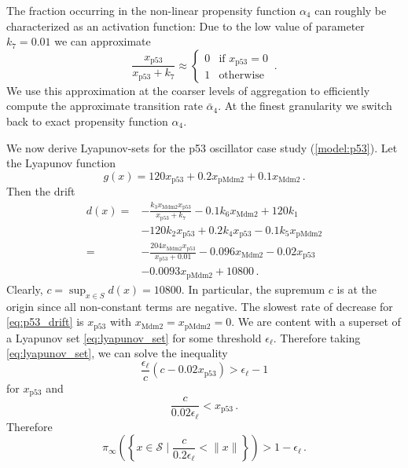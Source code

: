 The fraction occurring in the non-linear propensity function
$\alpha_4$ can roughly be characterized as an activation function:
Due to the low value of parameter $k_7=0.01$ we can
approximate
\[\frac{x_{\mathrm{p53}}}{x_{\mathrm{p53}} + k_7}
  \approx
  \begin{cases}
    0 & \text{if } x_{\mathrm{p53}} = 0\\
    1 & \text{otherwise}
  \end{cases}\,.
\]
We use this approximation at the coarser levels of aggregation to
efficiently compute the approximate transition rate $\bar{\alpha}_4$.
At the finest granularity we switch back to exact propensity function
$\alpha_4$.

We now derive Lyapunov-sets for the p53 oscillator case study
(\autoref{model:p53}). Let the Lyapunov function
\begin{equation}
  g(x) = 120 x_{\mathrm{p53}} + 0.2 x_{\mathrm{pMdm2}} + 0.1
  x_{\mathrm{Mdm2}}\,.
\end{equation}
Then the drift
\begin{equation}\label{eq:p53_drift}
  \begin{split}
    d(x) = & - \frac{k_3 x_{\mathrm{Mdm2}}
    x_{\mathrm{p53}}}{x_{\mathrm{p53}} + k_7}
    - 0.1 k_6 x_{\mathrm{Mdm2}}
    + 120 k_1 \\
    & - 120 k_2 x_{\mathrm{p53}}
    + 0.2 k_4 x_{\mathrm{p53}}
    - 0.1 k_5 x_{\mathrm{pMdm2}}  \\
    = & - \frac{204 x_{\mathrm{Mdm2}} x_{\mathrm{p53}}}{x_{\mathrm{p53}} + 0.01}
    - 0.096 x_{\mathrm{Mdm2}}
    - 0.02 x_{\mathrm{p53}} \\
    &- 0.0093 x_{\mathrm{pMdm2}}
    + \num{10800}\,.
  \end{split}
\end{equation}
Clearly, $c = \sup_{x\in{S}} d(x) = \num{10800}$.
In particular, the supremum $c$ is at the origin since all
non-constant terms are negative.
The slowest rate of decrease for \eqref{eq:p53_drift} is
$x_{\mathrm{p53}}$ with $x_{\mathrm{Mdm2}} = x_{\mathrm{pMdm2}} = 0$.
We are content with a superset of a Lyapunov set
\eqref{eq:lyapunov_set} for some threshold $\epsilon_{\ell}$.
Therefore taking \eqref{eq:lyapunov_set}, we can solve the inequality
\[
  \frac{\epsilon_{\ell}}{c}(c - \num{0.02} x_{\mathrm{p53}}) >
  \epsilon_{\ell} - 1
\]
for $x_{\mathrm{p53}}$ and
\begin{equation*}
  \frac{c}{0.02 \epsilon_{\ell}} < x_{\mathrm{p53}}\,.
\end{equation*}
Therefore
\begin{equation*}
  \pi_{\infty}\left(\left\{x\in\mathcal{S} \mid
  \frac{c}{0.2\epsilon_{\ell}} < \lVert x \rVert \right\}\right) > 1
  - \epsilon_{\ell}\,.
\end{equation*}

